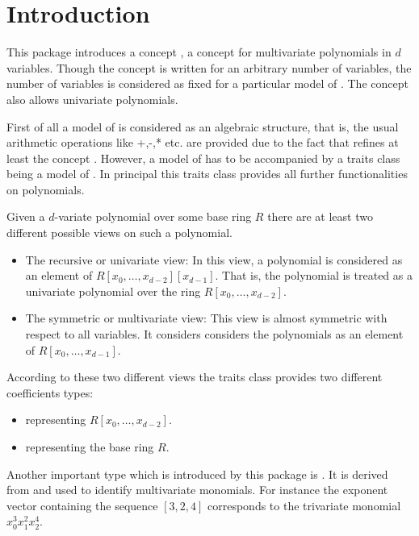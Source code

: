 

\section{Introduction}

This package introduces a concept , a concept for multivariate 
polynomials in $d$ variables. Though the concept is written for an arbitrary 
number of variables, the number of variables is considered as fixed for a 
particular model of . 
The concept also allows univariate polynomials.

First of all a model of  is considered as an algebraic 
structure, that is, the usual arithmetic operations like +,-,* etc. are 
provided due to the fact that  refines at least the 
concept . 
However, a model of  has to be accompanied by a traits class 
 being a model of 
. 
In principal this traits class provides all further functionalities 
on polynomials.

Given a $d$-variate polynomial over some base ring $R$ there are at least 
two different possible views on such a polynomial.
\begin{itemize}
\item The recursive or univariate view:  
In this view, a polynomial is considered as 
an element of $R[x_0,\dots,x_{d-2}][x_{d-1}]$. That is, the polynomial 
is treated as a univariate polynomial over the ring $R[x_0,\dots,x_{d-2}]$. 
\item The symmetric or multivariate view: 
This view is almost symmetric with respect to all variables. It considers 
considers the polynomials as an element of $R [x_0,\dots,x_{d-1}]$.
\end{itemize}

According to these two different views the traits class provides two 
different coefficients types:
\begin{itemize}
\item {} 
representing $R[x_0,\dots,x_{d-2}]$.
\item {} 
representing the base ring $R$.
\end{itemize}

Another important type which is introduced by this package is 
. 
It is derived from  and used to identify multivariate 
monomials. For instance the exponent vector containing the sequence 
$[3,2,4]$ corresponds to the trivariate monomial $x_0^3x_1^2x_2^4$. 


